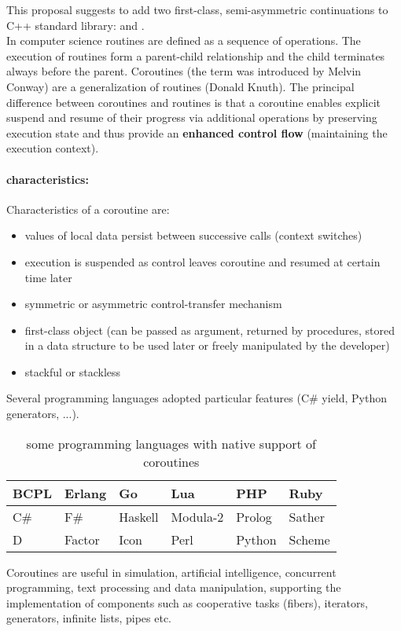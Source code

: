 
This proposal suggests to add two first-class, semi-asymmetric continuations to
C++ standard library: \pullcoro and \pushcoro.\\
\newline
In computer science routines are defined as a sequence of operations. The
execution of routines form a parent-child relationship and the child terminates
always before the parent. Coroutines (the term was introduced by Melvin
Conway\cite{Conway1963}) are a generalization of routines (Donald
Knuth\cite{Knuth1997}). The principal difference between coroutines and routines
is that a coroutine enables explicit suspend and resume of their progress via
additional operations by preserving execution state and thus provide an
{\bf enhanced control flow} (maintaining the execution context).\\

\paragraph*{characteristics:}
Characteristics\cite{Moura2009} of a coroutine are:
\begin{itemize}
    \item values of local data persist between successive calls (context
          switches)
    \item execution is suspended as control leaves coroutine and resumed at
          certain time later
    \item symmetric or asymmetric control-transfer mechanism
    \item first-class object (can be passed as argument, returned by procedures,
          stored in a data structure to be used later or freely manipulated by
          the developer)
    \item stackful or stackless
\end{itemize}

Several programming languages adopted particular features (C\# yield, Python
generators, ...).
\begin{table}[h]
    \centering
    \begin{tabular}{ l l l l l l }
        \midrule
        BCPL    &   Erlang  &   Go      &   Lua         &   PHP     &   Ruby\\
        \midrule
        C\#     &   F\#     &   Haskell &   Modula-2    &   Prolog  &   Sather\\
        \midrule
        D       &   Factor  &   Icon    &   Perl        &   Python  &   Scheme\\
        \midrule
    \end{tabular}
    \caption{some programming languages with native support of coroutines
        \cite{wikipedia}}
\end{table}
\newline
Coroutines are useful in simulation, artificial intelligence, concurrent
programming, text processing and data manipulation\cite{Moura2009}, supporting
the implementation of components such as cooperative tasks (fibers), iterators,
generators, infinite lists, pipes etc.

